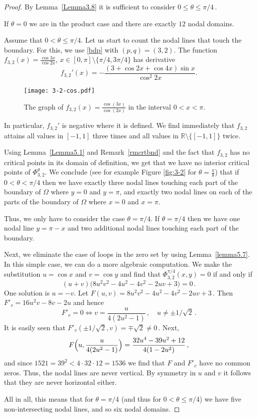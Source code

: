 \documentclass[a4paper,reqno,11pt]{amsart}
\theoremstyle{remark}
\theoremstyle{definition}
\numberwithin{equation}{section}
\begin{document}
\begin{proof}
By Lemma~\ref{Lemma3.8} it is sufficient to
consider $0\leq \theta\leq \pi/4\,$.

If $\theta=0$ we are in the product case and there are exactly
$12$ nodal domains.

Assume that $0<\theta\leq \pi/4$. Let us start to count the nodal
lines that touch the boundary. For this, we use \eqref{bdp} with $(p,q)=(3,2)$.
The function $f_{3,2}(x)=\frac{\cos3x}{\cos 2x}$, 
$x\in[0,\pi]\setminus\{\pi/4,3\pi/4\}$ has derivative 
\[
f_{3,2}'(x)=-\frac{(3+\cos 2x+\cos 4x)\sin x}{\cos^2 2x}. 
\]

\begin{figure}[htbp]
\centering
\texttt{[image: 3-2-cos.pdf]}
\caption{The graph of $f_{3,2}(x)=\frac{\cos(3x)}{\cos(2x)}$ in the interval 
$0<x<\pi$.}
\label{fig:3-2-cos}
\end{figure}

In particular, $f_{3,2}'$ is negative where it is defined. 
We find immediately that $f_{3,2}$ attains 
all values in $[-1,1]$ three times and  all values in 
$\mathbb{R}\setminus\{[-1,1]\}$ twice.

Using Lemma~\ref{Lemma5.1} and  Remark~\ref{rmcrtbnd} and the fact that 
$f_{3,2}$ has no critical points in its domain of definition, we get that 
we have no interior critical points of $\Phi_{3,2}^{\theta}$.
We conclude (see for example Figure \ref{fig:3-2} for $\theta =\frac \pi 8$) 
that if $0<\theta<\pi/4$ then we have exactly
three nodal lines touching each part of the boundary of $\Omega$ where $y=0$ 
and $y=\pi$, and exactly two nodal lines on each of the parts of the boundary 
of $\Omega$ where $x=0$ and $x=\pi$. 

Thus, we only have to consider the case $\theta=\pi/4$.
If $\theta=\pi/4$ then we have one nodal line $y=\pi-x$ and two additional
nodal lines touching each part of the boundary.

Next, we eliminate the case of loops in the zero set by 
using Lemma~\ref{lemma5.7}.  In this simple case, we can do a more 
algebraic computation. We make the substitution
$u=\cos x$ and $v=\cos y$ and find that $\Phi_{3,2}^{\pi/4}(x,y)=0$ if
and only if
\[
(u+v)\bigl(8u^2v^2-4u^2-4v^2 - 2uv+3 \bigr)=0\,.
\]
One solution is $u=-v$. Let $F(u,v)=8u^2v^2-4u^2-4v^2-2uv+3\,$. Then
$F'_v=16u^2v-8v-2u$ and hence
\[
F'_v = 0 \iff v=\frac{u}{4(2u^2-1)}\,,\quad u\neq\pm1/\sqrt{2}\,.
\]
It is easily seen that $F'_v(\pm1/\sqrt{2},v)=\mp \sqrt{2}\neq 0\,$. Next,
\[
F\Bigl(u,\frac{u}{4(2u^2-1)}\Bigr)= \frac{32u^4-39u^2+12}{4(1-2u^2)}\,,
\]
and since $1521=39^2<4\cdot32\cdot12=1536$ we find that $F$ and $F'_v$ have
no common zeros. Thus, the nodal lines are never vertical. By symmetry in
$u$ and $v$ it follows that they are never horizontal either.

All in all, this means that for $\theta=\pi/4$ (and thus for 
$0<\theta\leq\pi/4$) we have five non-intersecting nodal lines, and 
so six nodal domains.
\end{proof}
\end{document}
